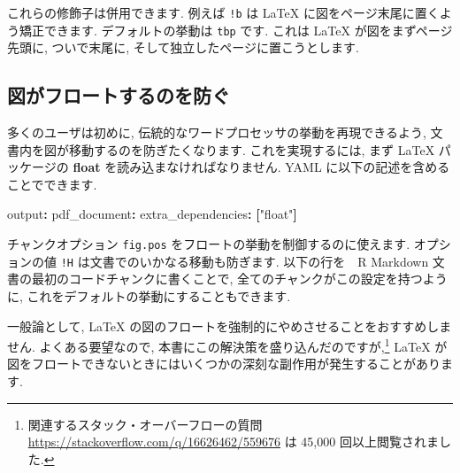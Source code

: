 \documentclass[
  11pt,
]{bxjsreport}
\newenvironment{Shaded}{\begin{snugshade}}{\end{snugshade}}
\newcommand{\AttributeTok}[1]{\textcolor[rgb]{0.77,0.63,0.00}{#1}}
\newcommand{\FunctionTok}[1]{\textcolor[rgb]{0.00,0.00,0.00}{#1}}
\newcommand{\KeywordTok}[1]{\textcolor[rgb]{0.13,0.29,0.53}{\textbf{#1}}}
\newcommand{\NormalTok}[1]{#1}
\newcommand{\SpecialCharTok}[1]{\textcolor[rgb]{0.00,0.00,0.00}{#1}}
\newcommand{\StringTok}[1]{\textcolor[rgb]{0.31,0.60,0.02}{#1}}
\begin{document}
これらの修飾子は併用できます. 例えば \texttt{!b} は LaTeX に図をページ末尾に置くよう矯正できます. デフォルトの挙動は \texttt{tbp} です. これは LaTeX が図をまずページ先頭に, ついで末尾に, そして独立したページに置こうとします.

\hypertarget{prevent-figures-from-floating}{%
\subsection{図がフロートするのを防ぐ}\label{prevent-figures-from-floating}}

多くのユーザは初めに, 伝統的なワードプロセッサの挙動を再現できるよう, 文書内を図が移動するのを防ぎたくなります. これを実現するには, まず LaTeX パッケージの \textbf{float} を読み込まなければなりません. YAML に以下の記述を含めることでできます.

\begin{Shaded}
\begin{Highlighting}[]
\FunctionTok{output}\KeywordTok{:}\AttributeTok{ }
\AttributeTok{  }\FunctionTok{pdf\_document}\KeywordTok{:}
\AttributeTok{    }\FunctionTok{extra\_dependencies}\KeywordTok{:}\AttributeTok{ }\KeywordTok{[}\StringTok{"float"}\KeywordTok{]}
\end{Highlighting}
\end{Shaded}

チャンクオプション \texttt{fig.pos} をフロートの挙動を制御するのに使えます. オプションの値 \texttt{!H} は文書でのいかなる移動も防ぎます. 以下の行を　R Markdown 文書の最初のコードチャンクに書くことで, 全てのチャンクがこの設定を持つように, これをデフォルトの挙動にすることもできます.

\begin{Shaded}
\end{Shaded}

一般論として, LaTeX の図のフロートを強制的にやめさせることをおすすめしません. よくある要望なので, 本書にこの解決策を盛り込んだのですが,\footnote{関連するスタック・オーバーフローの質問 \url{https://stackoverflow.com/q/16626462/559676} は 45,000 回以上閲覧されました.} LaTeX が図をフロートできないときにはいくつかの深刻な副作用が発生することがあります.
\end{document}
